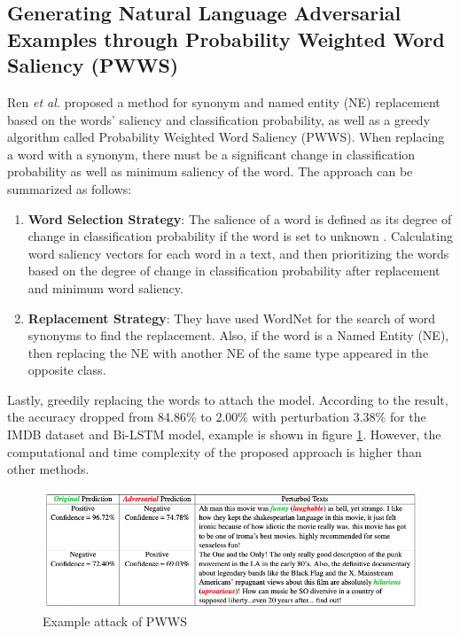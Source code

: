 \documentclass[%
	BCOR=8mm, %
	DIV=12,
	toc=bibliography, %
	toc=listof, %
	oneside, %
	egregdoesnotlikesansseriftitles, %
	]{scrbook}
\begin{document}
\subsection{Generating Natural Language Adversarial Examples through Probability Weighted Word Saliency (PWWS)}
\label{subsection:generatingadversarialexample}
Ren \textit{et al.} \cite{ren_generating_2019} proposed a method for synonym and named entity (NE) replacement based on the words' saliency and classification probability, as well as a greedy algorithm called Probability Weighted Word Saliency (PWWS). When replacing a word with a synonym, there must be a significant change in classification probability as well as minimum saliency of the word. The approach can be summarized as follows:

\begin{enumerate}
    \item \textbf{Word Selection Strategy}:  
   The salience of a word is defined as its degree of change in classification probability if the word is set to unknown \cite{li_understanding_2017}. Calculating word saliency vectors for each word in a text, and then prioritizing the words based on the degree of change in classification probability after replacement and minimum word saliency.
    \item \textbf{Replacement Strategy}: They have used WordNet for the search of word synonyms to find the replacement. Also, if the word is a Named Entity (NE), then replacing the NE with another NE of the same type appeared in the opposite class.
\end{enumerate}
Lastly, greedily replacing the words to attach the model. According to the result, the accuracy dropped from 84.86\% to 2.00\% with perturbation 3.38\% for the IMDB dataset and Bi-LSTM model, example is shown in figure \ref{diag:pwwsexp}. However, the computational and time complexity of the proposed approach is higher than other methods.
\begin{figure}[H]
    \centering
    \includegraphics[width=1.0\textwidth]{img/PWWSexample.png}
    \caption[Example of PWWS attack recipe]{Example attack of PWWS\cite{ren_generating_2019} }
    \label{diag:pwwsexp}
\end{figure}
\end{document}
